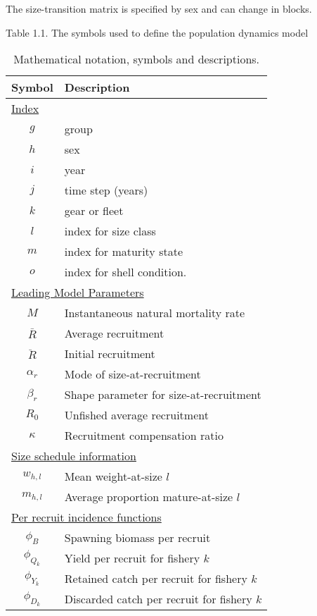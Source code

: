 \documentclass[]{article}
\begin{document}
The size-transition matrix is specified by sex and can change in blocks.

Table 1.1. The symbols used to define the population dynamics model

\begin{table}
  \centering
  \caption{Mathematical notation, symbols and descriptions.}
  \label{tab:notation}
  \begin{tabular}{cl}
  \hline
  Symbol  & Description \\
  \hline
  \multicolumn{2}{l}{\underline{Index}}\\
      $g$ & group \\
      $h$ & sex \\
      $i$ & year \\
      $j$ & time step (years) \\
      $k$ & gear or fleet \\
      $l$ & index for size class \\
      $m$ & index for maturity state \\
      $o$ & index for shell condition. \\
  \multicolumn{2}{l}{\underline{Leading Model Parameters}}\\
      $M$         & Instantaneous natural mortality rate\\
      $\bar{R}$   & Average recruitment\\
      $\ddot{R}$  & Initial recruitment\\
      $\alpha_r$  & Mode of size-at-recruitment\\
      $\beta_r $  & Shape parameter for size-at-recruitment\\
      $R_0$       & Unfished average recruitment\\
      $\kappa$    & Recruitment compensation ratio\\
  \multicolumn{2}{l}{\underline{Size schedule information}}\\
      $w_{h,l}$   & Mean weight-at-size $l$ \\
      $m_{h,l}$   & Average proportion mature-at-size $l$ \\
  \multicolumn{2}{l}{\underline{Per recruit incidence functions}} \\
      $\phi_B$    & Spawning biomass per recruit \\
      $\phi_{Q_k}$& Yield per recruit for fishery $k$\\
      $\phi_{Y_k}$& Retained catch per recruit for fishery $k$ \\
      $\phi_{D_k}$& Discarded catch per recruit for fishery $k$ \\

\end{tabular}
\end{table}
\end{document}

